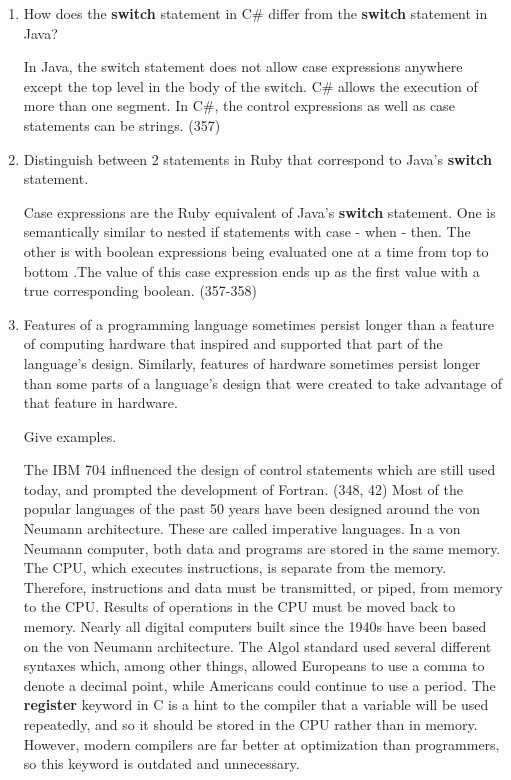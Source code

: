 \begin{enumerate}
  \item How does the \textbf{switch} statement in C\#
    differ from the \textbf{switch} statement in Java?

 \begin{answer}
   In Java, the switch statement does not allow case expressions anywhere except the top level in the body of the switch.  C\#  allows the execution of more than one segment. In C\#, the control expressions as well as case statements can be strings. (357)
 \end{answer}
 
  \item Distinguish between 2 statements in Ruby
    that correspond to Java's \textbf{switch} statement.

 \begin{answer}
    Case expressions are the Ruby equivalent of Java's \textbf{switch} statement. One is semantically similar to nested if statements with case - when - then. The other is with boolean expressions being evaluated one at a time from top to bottom .The value of this case expression ends up as the first value with a true corresponding boolean. (357-358)
     \end{answer}

  \item Features of a programming language sometimes persist
    longer than a feature of computing hardware that inspired
    and supported that part of the language's design.
    Similarly, features of hardware sometimes persist longer
    than some parts of a language's design that were created
    to take advantage of that feature in hardware.

    Give examples.

 \begin{answer}
    The IBM 704 influenced the design of control statements which are still used today, and prompted the development of Fortran. (348, 42)
    Most of the popular languages of the past 50 years have been designed around the von Neumann architecture. These are called imperative languages. In a von Neumann computer, both data and programs are stored in the same memory. The CPU, which executes instructions, is separate from the memory. Therefore, instructions and data must be transmitted, or piped, from memory to the CPU. Results of operations in the CPU must be moved back to memory. Nearly all digital computers built since the 1940s have been based on the von Neumann architecture.
The Algol standard used several different syntaxes which, among other things, allowed Europeans to use a comma to denote a decimal point, while Americans could continue to use a period.
  The \textbf{register} keyword in C is a hint to the compiler that a variable will be used repeatedly, and so it should be stored in the CPU rather than in memory. However, modern compilers are far better at optimization than programmers, so this keyword is outdated and unnecessary.
     \end{answer}


\end{enumerate}
